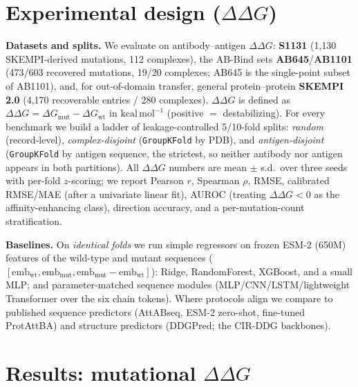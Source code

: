 \documentclass{article}
\newcommand{\ddg}{\ensuremath{\Delta\Delta G}}
\begin{document}
\section{Experimental design (\ddg{})}
\textbf{Datasets and splits.} We evaluate on antibody--antigen \ddg{}: \textbf{S1131} (1{,}130 SKEMPI-derived
mutations, 112 complexes), the AB-Bind sets \textbf{AB645}/\textbf{AB1101} (473/603 recovered mutations,
19/20 complexes; AB645 is the single-point subset of AB1101), and, for out-of-domain transfer, general
protein--protein \textbf{SKEMPI 2.0} (4{,}170 recoverable entries / 280 complexes). \ddg{} is defined as
$\ddg=\Delta G_{\mathrm{mut}}-\Delta G_{\mathrm{wt}}$ in $\mathrm{kcal\,mol^{-1}}$ (positive $=$
destabilizing). For every benchmark we build a ladder of leakage-controlled 5/10-fold splits:
\emph{random} (record-level), \emph{complex-disjoint} (\texttt{GroupKFold} by PDB), and
\emph{antigen-disjoint} (\texttt{GroupKFold} by antigen sequence, the strictest, so neither antibody nor
antigen appears in both partitions). All \ddg{} numbers are mean $\pm$ s.d.\ over three seeds with per-fold
$z$-scoring; we report Pearson $r$, Spearman $\rho$, RMSE, calibrated RMSE/MAE (after a univariate linear
fit), AUROC (treating $\ddg<0$ as the affinity-enhancing class), direction accuracy, and a
per-mutation-count stratification.

\textbf{Baselines.} On \emph{identical folds} we run simple regressors on frozen ESM-2 (650M) features of
the wild-type and mutant sequences ($[\text{emb}_{\mathrm{wt}},\text{emb}_{\mathrm{mut}},
\text{emb}_{\mathrm{mut}}-\text{emb}_{\mathrm{wt}}]$): Ridge, RandomForest, XGBoost, and a small MLP; and
parameter-matched sequence modules (MLP/CNN/LSTM/lightweight Transformer over the six chain tokens). Where
protocols align we compare to published sequence predictors (AttABseq, ESM-2 zero-shot, fine-tuned
ProtAttBA) and structure predictors (DDGPred; the CIR-DDG backbones).

\section{Results: mutational \ddg{}}
\end{document}
